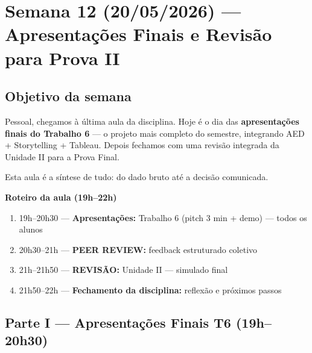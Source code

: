 
\chapter{Semana 12 (20/05/2026) — Apresentações Finais e Revisão para Prova II}

\section{Objetivo da semana}

Pessoal, chegamos à última aula da disciplina. Hoje é o dia das
\textbf{apresentações finais do Trabalho 6} — o projeto mais completo do
semestre, integrando AED + Storytelling + Tableau. Depois fechamos com
uma revisão integrada da Unidade II para a Prova Final.

Esta aula é a síntese de tudo: do dado bruto até a decisão comunicada.

\begin{BoardBox}
\textbf{Roteiro da aula (19h–22h)}
\begin{enumerate}
  \item 19h–20h30 — \textbf{Apresentações:} Trabalho 6 (pitch 3 min + demo) — todos os alunos
  \item 20h30–21h — \textbf{PEER REVIEW:} feedback estruturado coletivo
  \item 21h–21h50 — \textbf{REVISÃO:} Unidade II — simulado final
  \item 21h50–22h — \textbf{Fechamento da disciplina:} reflexão e próximos passos
\end{enumerate}
\end{BoardBox}

\section{Parte I — Apresentações Finais T6 (19h–20h30)}

